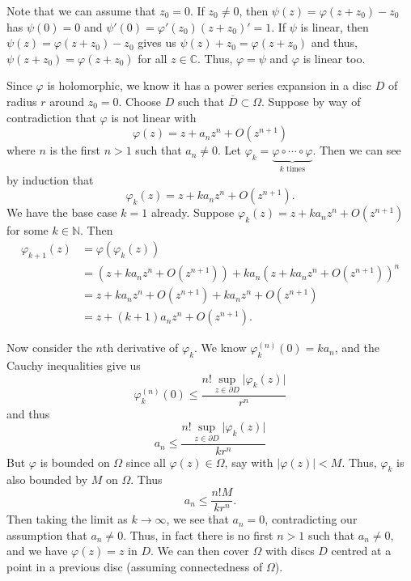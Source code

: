\documentclass[12 pt, letterpaper]{hmcpset}
\begin{document}
\begin{solution}
	Note that we can assume that $z_{0} = 0$. If $z_{0} \neq 0$, then $\psi(z) = \varphi(z + z_{0}) - z_{0}$ has $\psi(0) = 0$ and $\psi'(0) = \varphi'(z_{0}) (z + z_{0})' = 1$. If $\psi$ is linear, then $\psi(z) = \varphi(z + z_{0}) - z_{0}$ gives us $\psi(z) + z_{0} = \varphi(z + z_{0})$ and thus, $\psi(z + z_{0}) = \varphi(z + z_{0})$ for all $z \in \mathbb{C}$. Thus, $\varphi = \psi$ and $\varphi$ is linear too.

	Since $\varphi$ is holomorphic, we know it has a power series expansion in a disc $D$ of radius $r$ around $z_{0} = 0$. Choose $D$ such that $\overline{D} \subset \Omega$. Suppose by way of contradiction that $\varphi$ is not linear with
	\[
		\varphi(z) = z + a_{n} z^{n} + O(z^{n + 1})
	\]
	where $n$ is the first $n > 1$ such that $a_{n} \neq 0$. Let $\varphi_{k} = \underbrace{\varphi \circ \cdots \circ \varphi}_{k \text{ times}}$. Then we can see by induction that
	\[
		\varphi_{k}(z) = z + k a_{n} z^{n} + O(z^{n + 1}).
	\]
	We have the base case $k = 1$ already. Suppose $\varphi_{k}(z) = z + k a_{n} z^{n} + O(z^{n + 1})$ for some $k \in \mathbb{N}$. Then
	\[
		\begin{split}
			\varphi_{k + 1}(z) & = \varphi(\varphi_{k}(z)) \\
					   & = (z + k a_{n} z^{n} + O(z^{n + 1})) + k a_{n}(z + k a_{n} z^{n} + O(z^{n + 1}))^{n} \\
					   & = z + ka_{n}z^{n} + O(z^{n + 1}) + k a_{n} z^{n} + O(z^{n + 1}) \\
					   & = z + (k + 1) a_{n} z^{n} + O(z^{n + 1}).
		\end{split}
	\]

	Now consider the $n$th derivative of $\varphi_{k}$. We know $\varphi_{k}^{(n)}(0) = k a_{n}$, and the Cauchy inequalities give us
	\[
		\varphi_{k}^{(n)}(0) \le \frac{n! \sup_{z \in \partial D} \lvert \varphi_{k} (z) \rvert}{r^{n}}
	\]
	and thus
	\[
		a_{n} \le \frac{n! \sup_{z \in \partial D} \lvert \varphi_{k}(z) \rvert}{k r^{n}}
	\]
	But $\varphi$ is bounded on $\Omega$ since all $\varphi(z) \in \Omega$, say with $\lvert \varphi(z) \rvert < M$. Thus, $\varphi_{k}$ is also bounded by $M$ on $\Omega$. Thus
	\[
		a_{n} \le \frac{n! M}{k r^{n}}.
	\]
	Then taking the limit as $k \to \infty$, we see that $a_{n} = 0$, contradicting our assumption that $a_{n} \neq 0$. Thus, in fact there is no first $n > 1$ such that $a_{n} \neq 0$, and we have $\varphi(z) = z$ in $D$. We can then cover $\Omega$ with discs $D$ centred at a point in a previous disc (assuming connectedness of $\Omega$).
\end{solution}
\end{document}
